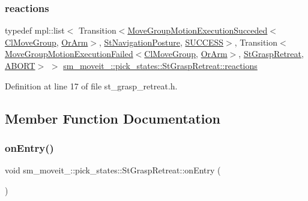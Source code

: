 \subsubsection{\texorpdfstring{reactions}{reactions}}
{\footnotesize\ttfamily typedef mpl\+::list$<$ Transition$<$\hyperlink{structmoveit__z__client_1_1MoveGroupMotionExecutionSucceded}{Move\+Group\+Motion\+Execution\+Succeded}$<$\hyperlink{classmoveit__z__client_1_1ClMoveGroup}{Cl\+Move\+Group}, \hyperlink{classsm__moveit__4_1_1OrArm}{Or\+Arm}$>$, \hyperlink{structsm__moveit__4_1_1pick__states_1_1StNavigationPosture}{St\+Navigation\+Posture}, \hyperlink{classSUCCESS}{S\+U\+C\+C\+E\+SS}$>$, Transition$<$\hyperlink{structmoveit__z__client_1_1MoveGroupMotionExecutionFailed}{Move\+Group\+Motion\+Execution\+Failed}$<$\hyperlink{classmoveit__z__client_1_1ClMoveGroup}{Cl\+Move\+Group}, \hyperlink{classsm__moveit__4_1_1OrArm}{Or\+Arm}$>$, \hyperlink{structsm__moveit__4_1_1pick__states_1_1StGraspRetreat}{St\+Grasp\+Retreat}, \hyperlink{classABORT}{A\+B\+O\+RT}$>$ $>$ \hyperlink{structsm__moveit__4_1_1pick__states_1_1StGraspRetreat_a4f5f191fa9aeaa24fd24043f983f43a8}{sm\+\_\+moveit\+\_\+::pick\+\_\+states\+::\+St\+Grasp\+Retreat\+::reactions}}



Definition at line 17 of file st\+\_\+grasp\+\_\+retreat.\+h.



\subsection{Member Function Documentation}
\mbox{\label{structsm__moveit__4_1_1pick__states_1_1StGraspRetreat_a72c11fb9d9c2a1180314e03b436334d7}} 
\subsubsection{\texorpdfstring{on\+Entry()}{onEntry()}}
{\footnotesize\ttfamily void sm\+\_\+moveit\+\_\+::pick\+\_\+states\+::\+St\+Grasp\+Retreat\+::on\+Entry (\begin{DoxyParamCaption}{ }\end{DoxyParamCaption})\hspace{0.3cm}{\ttfamily [inline]}}



